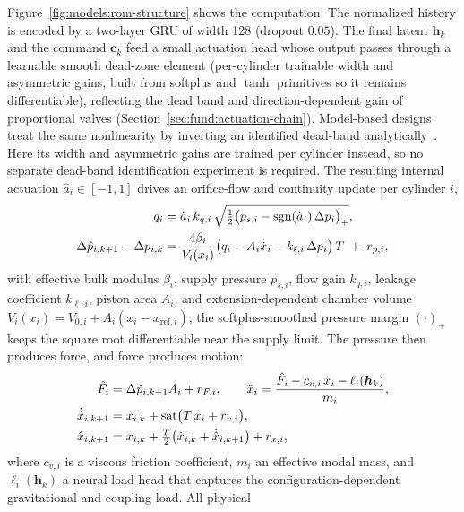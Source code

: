 Figure~\ref{fig:models:rom-structure} shows the computation. The normalized
history is encoded by a two-layer GRU of width 128 (dropout $0.05$). The
final latent $\bm{h}_k$ and the command $\bm{c}_k$ feed a small actuation
head whose output passes through a learnable smooth dead-zone element
(per-cylinder trainable width and asymmetric gains, built from softplus
and $\tanh$ primitives so it remains differentiable), reflecting the dead band
and direction-dependent gain of proportional valves
(Section~\ref{sec:fund:actuation-chain}). Model-based designs treat the same
nonlinearity by inverting an identified dead-band
analytically~\cite{yang2026stateconstrained}. Here its width and asymmetric
gains are trained per cylinder instead, so no separate dead-band
identification experiment is required. The resulting
internal actuation $\hat{a}_i \in [-1,1]$ drives an orifice-flow and
continuity update per cylinder $i$,
%
\begin{align}
  q_i &= \hat{a}_i\, k_{q,i}\,
    \sqrt{\tfrac{1}{2}\bigl(p_{s,i} - \operatorname{sgn}(\hat{a}_i)\,
    \Delta p_i\bigr)_{+}}, \notag \\
  \Delta \hat{p}_{i,k+1} - \Delta p_{i,k} &=
    \frac{4\beta_i}{V_i(x_i)}
    \bigl(q_i - A_i \dot{x}_i - k_{\ell,i}\, \Delta p_i\bigr)\, T
    \;+\; r_{p,i},
  \label{eq:models:rom-pressure}
\end{align}
%
with effective bulk modulus $\beta_i$, supply pressure $p_{s,i}$, flow gain
$k_{q,i}$, leakage coefficient $k_{\ell,i}$, piston area $A_i$, and
extension-dependent chamber volume
$V_i(x_i) = V_{0,i} + A_i (x_i - x_{\mathrm{ref},i})$; the softplus-smoothed
pressure margin $(\cdot)_+$ keeps the square root differentiable near the
supply limit. The pressure then produces force, and force produces motion:
%
\begin{align}
  \hat{F}_i &= \Delta\hat{p}_{i,k+1} A_i + r_{F,i}, \qquad
  \ddot{x}_i = \frac{\hat{F}_i - c_{v,i}\,\dot{x}_i - \ell_i(\bm{h}_k)}{m_i},
  \notag \\
  \dot{\hat{x}}_{i,k+1} &= \dot{x}_{i,k}
    + \operatorname{sat}\bigl(T\,\ddot{x}_i + r_{v,i}\bigr),
  \label{eq:models:rom-velocity} \\
  \hat{x}_{i,k+1} &= x_{i,k}
    + \tfrac{T}{2}\bigl(\dot{x}_{i,k} + \dot{\hat{x}}_{i,k+1}\bigr)
    + r_{x,i},
  \label{eq:models:rom-position}
\end{align}
%
where $c_{v,i}$ is a viscous friction coefficient, $m_i$ an effective
modal mass, and $\ell_i(\bm{h}_k)$ a neural load head that captures the
configuration-dependent gravitational and coupling load. All physical
